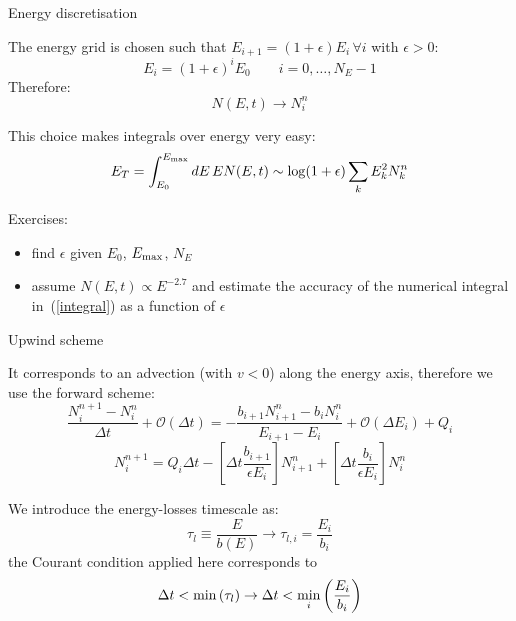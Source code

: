 \documentclass[9pt]{beamer}
\begin{document}
\begin{frame}{Energy discretisation}

The energy grid is chosen such that $E_{i+1} = (1 + \epsilon) E_i \, \forall i$ with $\epsilon > 0$:
%
\begin{equation*}
E_i = (1 + \epsilon)^i E_0 \qquad i = 0, \dots, N_E - 1
\end{equation*}
%
Therefore:
%
\begin{equation*}
N(E,t) \rightarrow N_i^n
\end{equation*}

This choice makes integrals over energy very easy:
%
\begin{equation}\label{integral}
E_T = \int_{E_0}^{E_{\rm max}} dE \, E N(E,t) \sim \log(1+\epsilon) \sum_k E_k^2 N_k^n
\end{equation}


{\color{orange}Exercises:}
%
\begin{itemize}
\item find $\epsilon$ given $E_0$, $E_{\rm max}$, $N_E$ \\
\item assume $N(E,t) \propto E^{-2.7}$ and estimate the accuracy of the numerical integral in~(\ref{integral}) as a function of $\epsilon$ \\
\end{itemize}
\end{frame}

\begin{frame}{Upwind scheme}

It corresponds to an {\color{orange}advection} (with $v < 0$) along the energy axis, therefore we use the forward scheme:
%
\begin{equation*}
\frac{N^{n+1}_i - N^n_i}{\Delta t} + {\mathcal O}(\Delta t) = -\frac{b_{i+1} N_{i+1}^n - b_i N_i^n}{E_{i+1} - E_i} + {\mathcal O}(\Delta E_i)+ Q_i
\end{equation*}
%
\begin{equation*}
N^{n+1}_i = Q_i \Delta t
- \left[ \Delta t \frac{b_{i+1}}{\epsilon E_i} \right] N_{i+1}^n
+ \left[ \Delta t \frac{b_{i}}{\epsilon E_i} \right] N_i^n
\end{equation*}

We introduce the energy-losses timescale as:
%
\begin{equation*}
\tau_l \equiv \frac{E}{b(E)} \rightarrow \tau_{l,i} = \frac{E_i}{b_i}
\end{equation*}
%
the Courant condition applied here corresponds to 
%
\begin{equation*}
\Delta t < {\rm min} \left( \tau_l \right) \rightarrow \Delta t < \underset{i}{\rm min} \left( \frac{E_i}{b_i} \right)
\end{equation*}




\end{frame}
\end{document}
